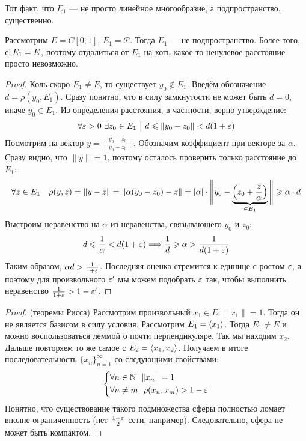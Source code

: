 \begin{note}
	Тот факт, что $E_1$ --- не просто линейное многообразие, а подпространство, существенно.
	
	Рассмотрим $E = C[0; 1]$, $E_1 = \mathcal{P}$. Тогда $E_1$ --- не подпространство. Более того, $\operatorname{cl} E_1 = E$, поэтому отдалиться от $E_1$ на хоть какое-то ненулевое расстояние просто невозможно.
\end{note}

\begin{proof}
	Коль скоро $E_1 \neq E$, то существует $y_0 \notin E_1$. Введём обозначение $d = \rho(y_0, E_1)$. Сразу понятно, что в силу замкнутости не может быть $d = 0$, иначе $y_0 \in E_1$. Из определения расстояния, в частности, верно утверждение:
	\[
		\forall \varepsilon > 0\ \exists z_0 \in E_1 \ \big|\  d \leqslant \|y_0 - z_0\| < d(1 + \varepsilon)
	\]
	Посмотрим на вектор $y = \frac{y_0 - z_0}{\|y_0 - z_0\|}$. Обозначим коэффициент при векторе за $\alpha$. Сразу видно, что $\|y\| = 1$, поэтому осталось проверить только расстояние до $E_1$:
	\[
		\forall z \in E_1\quad \rho(y, z) = \|y - z\| = \|\alpha(y_0 - z_0) - z\| = |\alpha| \cdot \Bigg\|y_0 - \underbrace{\left(z_0 + \frac{z}{\alpha}\right)}_{\in E_1}\Bigg\| \geqslant \alpha \cdot d
	\]
	Выстроим неравенство на $\alpha$ из неравенства, связывающего $y_0$ и $z_0$:
	\[
		d \leqslant \frac{1}{\alpha} < d(1 + \varepsilon) \Longrightarrow \frac{1}{d} \geqslant \alpha > \frac{1}{d(1 + \varepsilon)}
	\]
	Таким образом, $\alpha d > \frac{1}{1 + \varepsilon}$. Последняя оценка стремится к единице с ростом $\varepsilon$, а поэтому для произвольного $\varepsilon'$ мы можем подобрать $\varepsilon$ так, чтобы выполнить неравенство $\frac{1}{1 + \varepsilon} > 1 - \varepsilon'$.
\end{proof}

\begin{proof} (теоремы Рисса)
	Рассмотрим произвольный $x_1 \in E\colon \|x_1\| = 1$. Тогда он не является базисом в силу условия. Рассмотрим $E_1 = \left\langle x_1\right\rangle$. Тогда $E_1 \neq E$ и можно воспользоваться леммой о почти перпендикуляре. Так мы находим $x_2$. Дальше повторяем то же самое с $E_2 = \left\langle x_1, x_2\right\rangle$. Получаем в итоге последовательность $\{x_n\}_{n = 1}^\infty$ со следующими свойствами:
	\[
		\left\{ \begin{aligned} 
			&{\forall n \in \mathbb{N}\ \ \|x_n\| = 1}
			\\
			&{\forall n \neq m\ \ \rho(x_n, x_m) > 1 - \varepsilon}
		 \end{aligned} \right.
	\]
	Понятно, что существование такого подмножества сферы полностью ломает вполне ограниченность (нет $\frac{1 - \varepsilon}{2}$-сети, например). Следовательно, сфера не может быть компактом.
\end{proof}
